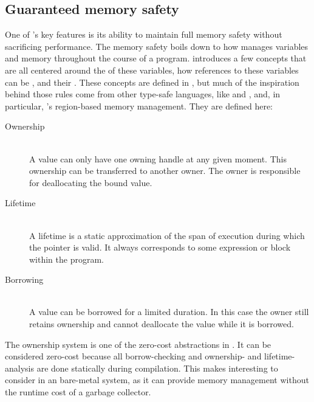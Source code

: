\subsection{Guaranteed memory safety}
\label{sec:guaranteed_memory_safety}

One of {\rust}'s key features is its ability to maintain full memory safety without sacrificing performance.
The memory safety boils down to how {\rust} manages variables and memory throughout the course of a program.
{\rust} introduces a few concepts that are all centered around the  of these variables, how references to these variables can be , and their .
These concepts are defined in {\rust}, but much of the inspiration behind those rules come from other type-safe languages, like {} and {}, and, in particular, {}'s \cite{Grossman2002,Swamy2006} region-based memory management.
They are defined here:

\begin{description}
\item [Ownership] \hfill \\
  A value can only have one owning handle at any given moment.
  This ownership can be transferred to another owner.
  The owner is responsible for deallocating the bound value.

\item [Lifetime] \hfill \\
  A lifetime is a static approximation of the span of execution during which the pointer is valid.
  It always corresponds to some expression or block within the program.

\item [Borrowing] \hfill \\
  A value can be borrowed for a limited duration.
  In this case the owner still retains ownership and cannot deallocate the value while it is borrowed.

\end{description}

The ownership system is one of the zero-cost abstractions in {\rust}.
It can be considered zero-cost because all borrow-checking and ownership- and lifetime-analysis are done statically during compilation.
This makes {\rust} interesting to consider in an bare-metal system, as it can provide memory management without the runtime cost of a garbage collector.



